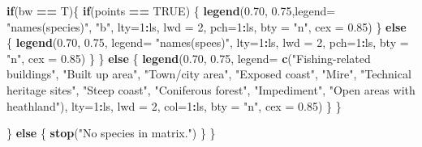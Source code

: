 \documentclass[]{article}
\newenvironment{Shaded}{\begin{snugshade}}{\end{snugshade}}
\newcommand{\ControlFlowTok}[1]{\textcolor[rgb]{0.13,0.29,0.53}{\textbf{#1}}}
\newcommand{\DataTypeTok}[1]{\textcolor[rgb]{0.13,0.29,0.53}{#1}}
\newcommand{\DecValTok}[1]{\textcolor[rgb]{0.00,0.00,0.81}{#1}}
\newcommand{\FloatTok}[1]{\textcolor[rgb]{0.00,0.00,0.81}{#1}}
\newcommand{\KeywordTok}[1]{\textcolor[rgb]{0.13,0.29,0.53}{\textbf{#1}}}
\newcommand{\NormalTok}[1]{#1}
\newcommand{\OperatorTok}[1]{\textcolor[rgb]{0.81,0.36,0.00}{\textbf{#1}}}
\newcommand{\OtherTok}[1]{\textcolor[rgb]{0.56,0.35,0.01}{#1}}
\newcommand{\StringTok}[1]{\textcolor[rgb]{0.31,0.60,0.02}{#1}}
\begin{document}
\begin{Shaded}
\begin{Highlighting}[]
      \ControlFlowTok{if}\NormalTok{(bw }\OperatorTok{==}\StringTok{ }\NormalTok{T)\{}
        \ControlFlowTok{if}\NormalTok{(points }\OperatorTok{==}\StringTok{ }\OtherTok{TRUE}\NormalTok{) \{}
          \KeywordTok{legend}\NormalTok{(}\FloatTok{0.70}\NormalTok{, }\FloatTok{0.75}\NormalTok{,}\DataTypeTok{legend=} \StringTok{"names(species)"}\NormalTok{, }\StringTok{"b"}\NormalTok{, }\DataTypeTok{lty=}\DecValTok{1}\OperatorTok{:}\NormalTok{ls, }\DataTypeTok{lwd =} \DecValTok{2}\NormalTok{, }\DataTypeTok{pch=}\DecValTok{1}\OperatorTok{:}\NormalTok{ls,}
                 \DataTypeTok{bty =} \StringTok{"n"}\NormalTok{, }\DataTypeTok{cex =} \FloatTok{0.85}\NormalTok{)}
\NormalTok{        \} }\ControlFlowTok{else}\NormalTok{ \{}
          \KeywordTok{legend}\NormalTok{(}\FloatTok{0.70}\NormalTok{, }\FloatTok{0.75}\NormalTok{, }\DataTypeTok{legend=} \StringTok{"names(spees)"}\NormalTok{, }\DataTypeTok{lty=}\DecValTok{1}\OperatorTok{:}\NormalTok{ls, }\DataTypeTok{lwd =} \DecValTok{2}\NormalTok{, }\DataTypeTok{pch=}\DecValTok{1}\OperatorTok{:}\NormalTok{ls,}
                 \DataTypeTok{bty =} \StringTok{"n"}\NormalTok{, }\DataTypeTok{cex =} \FloatTok{0.85}\NormalTok{)}
\NormalTok{        \}}
\NormalTok{      \} }\ControlFlowTok{else}\NormalTok{ \{}
        \KeywordTok{legend}\NormalTok{(}\FloatTok{0.70}\NormalTok{, }\FloatTok{0.75}\NormalTok{, }\DataTypeTok{legend=} \KeywordTok{c}\NormalTok{(}\StringTok{"Fishing-related buildings"}\NormalTok{, }\StringTok{"Built up area"}\NormalTok{, }\StringTok{"Town/city area"}\NormalTok{, }\StringTok{"Exposed coast"}\NormalTok{, }\StringTok{"Mire"}\NormalTok{, }\StringTok{"Technical heritage sites"}\NormalTok{, }\StringTok{"Steep coast"}\NormalTok{, }\StringTok{"Coniferous forest"}\NormalTok{, }\StringTok{"Impediment"}\NormalTok{, }\StringTok{"Open areas with heathland"}\NormalTok{), }\DataTypeTok{lty=}\DecValTok{1}\OperatorTok{:}\NormalTok{ls, }\DataTypeTok{lwd =} \DecValTok{2}\NormalTok{, }\DataTypeTok{col=}\DecValTok{1}\OperatorTok{:}\NormalTok{ls, }
               \DataTypeTok{bty =} \StringTok{"n"}\NormalTok{, }\DataTypeTok{cex =} \FloatTok{0.85}\NormalTok{)}
\NormalTok{      \}}
\NormalTok{    \}}
    
\NormalTok{  \}  }\ControlFlowTok{else}\NormalTok{ \{}
    \KeywordTok{stop}\NormalTok{(}\StringTok{"No species in matrix."}\NormalTok{)}
\NormalTok{  \}}
\NormalTok{\}}
\end{Highlighting}
\end{Shaded}
\end{document}
